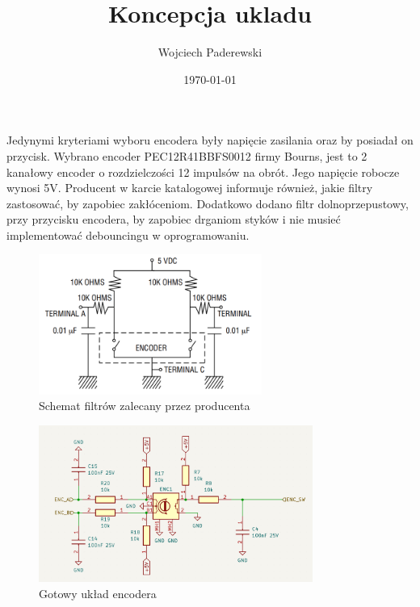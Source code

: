 \documentclass[../../main.tex]{subfiles}
\author{Wojciech Paderewski}
\date{\today}
\title{Koncepcja ukladu}
\begin{document}
Jedynymi kryteriami wyboru encodera były napięcie zasilania oraz by posiadał on przycisk.
Wybrano encoder PEC12R\-41BBF\-S0012 firmy Bourns\cite{st:encoder}, jest to 2 kanałowy encoder o rozdzielczości 12 impulsów na obrót. 
Jego napięcie robocze wynosi 5V. Producent w karcie katalogowej informuje również, jakie filtry zastosować, by zapobiec zakłóceniom.
Dodatkowo dodano filtr dolnoprzepustowy, przy przycisku encodera, by zapobiec drganiom  styków i nie musieć implementować debouncingu w oprogramowaniu.

\begin{figure}[H]
    \centering
    \includegraphics[width=0.65\textwidth]{encoder_karta.png}
    \caption{Schemat filtrów zalecany przez producenta\cite{st:encoder}}
\end{figure}

\begin{figure}[H]
    \centering
    \includegraphics[width=0.8\textwidth]{encoder.png}
    \caption{Gotowy układ encodera}
\end{figure}
\end{document}
